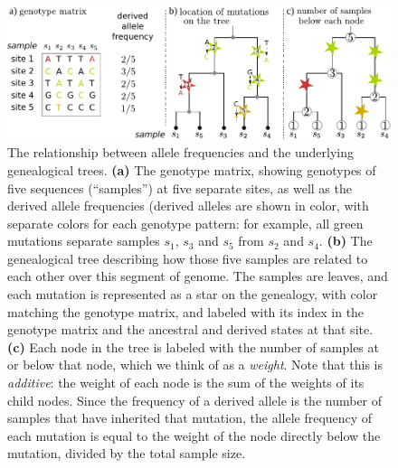 \documentclass[9pt,twoside,lineno]{gsajnl}
\begin{document}
\begin{figure}
    \begin{center}
        \includegraphics{figures/allele_frequency_diagram}
    \end{center}
    \caption{
        The relationship between allele frequencies and the underlying genealogical trees.
        \textbf{(a)} The genotype matrix, showing genotypes of five sequences (``samples'')
        at five separate sites,
        as well as the derived allele frequencies (derived alleles are shown in color,
        with separate colors for each genotype pattern:
        for example, all green mutations separate samples $s_1$, $s_3$ and $s_5$ from $s_2$ and $s_4$.
        \textbf{(b)} The genealogical tree describing how those five samples are related to each other
        over this segment of genome. The samples are leaves,
        and each mutation is represented as a star on the genealogy,
        with color matching the genotype matrix, and
        labeled with its index in the genotype matrix
        and the ancestral and derived states at that site.
        \textbf{(c)} Each node in the tree is labeled with the number of samples
        at or below that node, which we think of as a \emph{weight}.
        Note that this is \emph{additive}:
        the weight of each node is the sum of the weights of its child nodes.
        Since the frequency of a derived allele is the number of samples
        that have inherited that mutation, the allele frequency of each mutation
        is equal to the weight of the node directly below the mutation,
        divided by the total sample size.
        \label{fig:allele_freqs}
    }
\end{figure}
\end{document}

